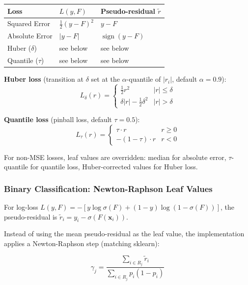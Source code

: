 \documentclass[11pt,a4paper]{article}
\theoremstyle{definition}
\theoremstyle{remark}
\DeclareMathOperator{\sign}{sign}
\begin{document}
\begin{center}
\begin{tabular}{lll}
\toprule
Loss & $L(y, F)$ & Pseudo-residual $\tilde{r}$ \\
\midrule
Squared Error & $\frac{1}{2}(y - F)^2$ & $y - F$ \\
Absolute Error & $|y - F|$ & $\sign(y - F)$ \\
Huber ($\delta$) & see below & see below \\
Quantile ($\tau$) & see below & see below \\
\bottomrule
\end{tabular}
\end{center}

\textbf{Huber loss} (transition at $\delta$ set at the $\alpha$-quantile of $|r_i|$, default $\alpha = 0.9$):
\begin{equation}
L_\delta(r) = \begin{cases} \frac{1}{2}r^2 & |r| \leq \delta \\ \delta|r| - \frac{1}{2}\delta^2 & |r| > \delta \end{cases}
\end{equation}

\textbf{Quantile loss} (pinball loss, default $\tau = 0.5$):
\begin{equation}
L_\tau(r) = \begin{cases} \tau \cdot r & r \geq 0 \\ -(1-\tau) \cdot r & r < 0 \end{cases}
\end{equation}

For non-MSE losses, leaf values are overridden: median for absolute error, $\tau$-quantile for quantile loss, Huber-corrected values for Huber loss.

\subsubsection*{Binary Classification: Newton-Raphson Leaf Values}

For log-loss $L(y, F) = -[y\log\sigma(F) + (1-y)\log(1-\sigma(F))]$, the pseudo-residual is $\tilde{r}_i = y_i - \sigma(F(\mathbf{x}_i))$.

Instead of using the mean pseudo-residual as the leaf value, the implementation applies a Newton-Raphson step (matching sklearn):

\begin{equation}
\gamma_j = \frac{\sum_{i \in R_j} \tilde{r}_i}{\sum_{i \in R_j} p_i(1-p_i)}
\end{equation}
\end{document}
